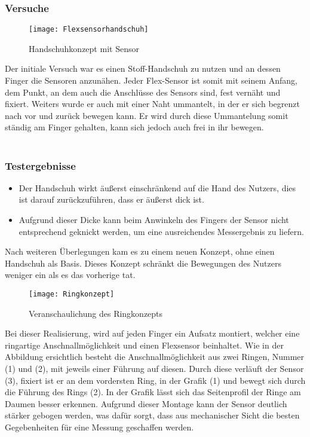 \documentclass[titlepage,12pt,twoside]{article}
\begin{document}
\subsubsection{Versuche}
\begin{figure}[H]
	\begin{center}
		\scalebox{0.5}
		{\texttt{[image: Flexsensorhandschuh]}}
		\caption{Handschuhkonzept mit Sensor}
		\label{fig:Flexsensorhandschuh}		
	\end{center}
\end{figure}
\hfill \break
Der initiale Versuch war es einen Stoff-Handschuh zu nutzen und an dessen Finger die Sensoren anzunähen. Jeder Flex-Sensor ist somit mit seinem Anfang, dem 
Punkt, an dem auch die Anschlüsse des Sensors sind, fest vernäht und fixiert. Weiters 
wurde er auch mit einer Naht ummantelt, in der er sich begrenzt nach vor und zurück 
bewegen kann. Er wird durch diese Ummantelung somit ständig am Finger gehalten, kann 
sich jedoch auch frei in ihr bewegen. \\
\\
\subsubsection{Testergebnisse}
\begin{itemize}
	\item Der Handschuh wirkt äußerst einschränkend auf die Hand des Nutzers, dies 
	ist darauf zurückzuführen, dass er äußerst dick ist.
	\item Aufgrund dieser Dicke kann beim Anwinkeln des Fingers der Sensor nicht 
	entsprechend geknickt werden, um eine ausreichendes Messergebnis zu liefern.
\end{itemize}
\hfill \break
Nach weiteren Überlegungen kam es zu einem neuen Konzept, ohne einen Handschuh als 
Basis. Dieses Konzept schränkt die Bewegungen des Nutzers weniger ein als es das vorherige tat. \\
\begin{figure}[H]
	\begin{center}
		\scalebox{0.5}
		{\texttt{[image: Ringkonzept]}}
		\caption{Veranschaulichung des Ringkonzepts}
		\label{fig:Ringkonzept}		
	\end{center}
\end{figure}
\hfill \break
Bei dieser Realisierung, wird auf jeden Finger ein Aufsatz montiert, welcher eine ringartige Anschnallmöglichkeit und einen Flexsensor beinhaltet.
Wie in der Abbildung ersichtlich besteht die Anschnallmöglichkeit aus zwei Ringen, Nummer (1) und (2), mit jeweils einer Führung auf diesen. Durch diese verläuft der Sensor (3), fixiert ist er an dem vordersten Ring, in der Grafik (1)
und bewegt sich durch die Führung des Rings (2). In der Grafik lässt sich das Seitenprofil der Ringe am Daumen besser erkennen.
Aufgrund dieser Montage kann der Sensor deutlich stärker gebogen werden, was dafür sorgt, dass aus mechanischer Sicht die besten Gegebenheiten für eine Messung geschaffen werden. \\
\end{document}
